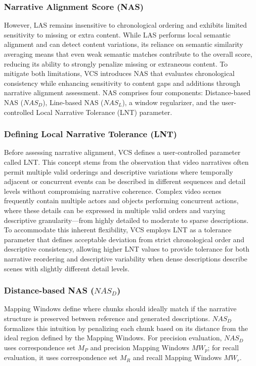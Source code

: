 \documentclass[main.tex]{subfiles}
\begin{document}
\subsubsection{Narrative Alignment Score (NAS)}
However, LAS remains insensitive to chronological ordering and exhibits limited sensitivity to missing or extra content. While LAS performs local semantic alignment and can detect content variations, its reliance on semantic similarity averaging means that even weak semantic matches contribute to the overall score, reducing its ability to strongly penalize missing or extraneous content. To mitigate both limitations, VCS introduces NAS that evaluates chronological consistency while enhancing sensitivity to content gaps and additions through narrative alignment assessment. NAS comprises four components: Distance-based NAS ($NAS_D$), Line-based NAS ($NAS_L$), a window regularizer, and the user-controlled Local Narrative Tolerance (LNT) parameter.

\subsubsection{Defining Local Narrative Tolerance (LNT)}
Before assessing narrative alignment, VCS defines a user-controlled parameter called LNT. This concept stems from the observation that video narratives often permit multiple valid orderings and descriptive variations where temporally adjacent or concurrent events can be described in different sequences and detail levels without compromising narrative coherence. Complex video scenes frequently contain multiple actors and objects performing concurrent actions, where these details can be expressed in multiple valid orders and varying descriptive granularity—from highly detailed to moderate to sparse descriptions. To accommodate this inherent flexibility, VCS employs LNT as a tolerance parameter that defines acceptable deviation from strict chronological order and descriptive consistency, allowing higher LNT values to provide tolerance for both narrative reordering and descriptive variability when dense descriptions describe scenes with slightly different detail levels.

\subsubsection{Distance-based NAS ($NAS_D$)}
Mapping Windows define where chunks should ideally match if the narrative structure is preserved between reference and generated descriptions. $NAS_D$ formalizes this intuition by penalizing each chunk based on its distance from the ideal region defined by the Mapping Windows. For precision evaluation, $NAS_D$ uses correspondence set $M_P$ and precision Mapping Windows $MW_p$; for recall evaluation, it uses correspondence set $M_R$ and recall Mapping Windows $MW_r$.
\end{document}
